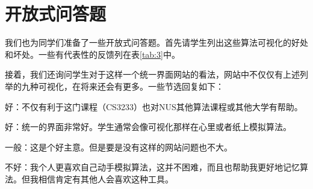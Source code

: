 \section{开放式问答题}
\begin{sectext}
我们也为同学们准备了一些开放式问答题。首先请学生列出这些算法可视化的好处和坏处。一些有代表性的反馈列在表\ref{tab:3}中。


接着，我们还询问学生对于这样一个统一界面网站的看法，网站中不仅仅有上述列举的九种可视化，在将来还会有更多。一些节选回复如下：

好：不仅有利于这门课程（CS3233）也对NUS其他算法课程或其他大学有帮助。

好：统一的界面非常好。学生通常会像可视化那样在心里或者纸上模拟算法。

一般：这是个好主意。但是要是没有这样的网站问题也不大。

不好：我个人更喜欢自己动手模拟算法，这并不困难，而且也帮助我更好地记忆算法。但我相信肯定有其他人会喜欢这种工具。
\end{sectext}
